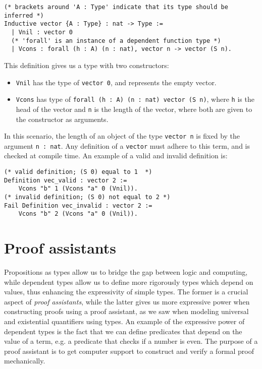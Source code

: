\begin{minipage}{\linewidth}
\begin{lstlisting}[language=Coq, label={lst:dep_type_vec}, caption={\lstinline{vector} in Coq, using dependent types}]
(* brackets around 'A : Type' indicate that its type should be inferred *)
Inductive vector {A : Type} : nat -> Type :=
  | Vnil : vector 0
  (* 'forall' is an instance of a dependent function type *)
  | Vcons : forall (h : A) (n : nat), vector n -> vector (S n).
\end{lstlisting}
\end{minipage}

This definition gives us a type with two constructors:

\begin{itemize}
    \item
        \lstinline{Vnil} has the type of \lstinline{vector 0}, and represents the empty vector.
    \item
        \lstinline{Vcons} has type of \lstinline{forall (h : A) (n : nat) vector (S n)}, where \lstinline{h}
                            is the head of the vector and \lstinline{n} is the length of the vector,
                            where both are given to the constructor as arguments.
\end{itemize}

In this scenario, the length of an object of the type \lstinline{vector n} is fixed by the argument \lstinline{n : nat}.
Any definition of a \lstinline{vector} must adhere to this term, and is checked at compile time.
An example of a valid and invalid definition is:

\begin{minipage}{\linewidth}
\begin{lstlisting}[language=Coq, label={lst:dep_type_vec_ex}, caption={Examples of vectors in Coq}]
(* valid definition; (S 0) equal to 1  *)
Definition vec_valid : vector 2 :=
    Vcons "b" 1 (Vcons "a" 0 (Vnil)).
(* invalid definition; (S 0) not equal to 2 *)
Fail Definition vec_invalid : vector 2 :=
    Vcons "b" 2 (Vcons "a" 0 (Vnil)).
\end{lstlisting}
\end{minipage}

\section{Proof assistants}
\label{sec:proof_assistants}

Propositions as types allow us to bridge the gap between logic and computing,
while dependent types allow us to define more rigorously types which depend on values,
thus enhancing the expressivity of simple types.
The former is a crucial aspect of \emph{proof assistants}, while the latter gives
us more expressive power when constructing proofs using a proof assistant,
as we saw when modeling universal and existential quantifiers using types.
An example of the expressive power of dependent types is the fact that we can define
predicates that depend on the value of a term, e.g. a predicate that checks if a number is even.
The purpose of a proof assistant is to get computer support to construct and verify a formal proof mechanically.

